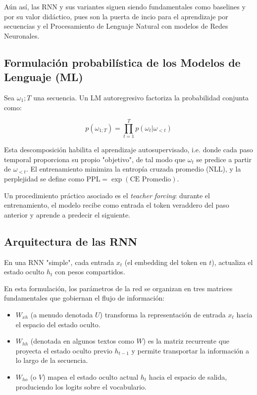Aún así, las RNN y sus variantes siguen siendo fundamentales como baselines y por su valor didáctico, pues son la puerta de incio para el aprendizaje por secuencias y el Procesamiento de Lenguaje Natural con modelos de Redes Neuronales. 

\subsection{Formulación probabilística de los Modelos de Lenguaje (ML)}

Sea $\omega_1;T$ una secuencia. Un LM autoregresivo factoriza la probabilidad conjunta como:

\[
    p(\omega_{1;T}) = \prod_{t=1}^T p(\omega_t | \omega_{<t})
\]

Esta descomposición habilita el aprendizaje autosupervisado, i.e. donde cada paso temporal proporciona su propio "objetivo", de tal modo que $\omega_t$ se predice a partir de $\omega_{<t}$. El entrenamiento minimiza la entropía cruzada promedio (NLL), y la perplejidad se define como $\text{PPL} = \exp(\text{CE Promedio})$. 

Un procedimiento práctico asociado es el \textit{teacher forcing}: durante el entrenamiento, el modelo recibe como entrada el token veraddero del paso anterior y aprende a predecir el siguiente. 

\subsection{Arquitectura de las RNN}

En una RNN "simple", cada entrada $x_t$ (el embedding del token en $t$), actualiza el estado oculto $h_t$ con pesos compartidos.

En esta formulación, los parámetros de la red se organizan en tres matrices fundamentales que gobiernan el flujo de información:

\begin{itemize}
    \item $W_{xh}$ (a menudo denotada $U$) transforma la representación de entrada $x_t$ hacia el espacio del estado oculto.
    \item $W_{hh}$ (denotada en algunos textos como $W$) es la matriz recurrente que proyecta el estado oculto previo $h_{t-1}$ y permite transportar la información a lo largo de la secuencia.
    \item $W_{ho}$ (o $V$) mapea el estado oculto actual $h_t$ hacia el espacio de salida, produciendo los logits sobre el vocabulario.  
\end{itemize}


